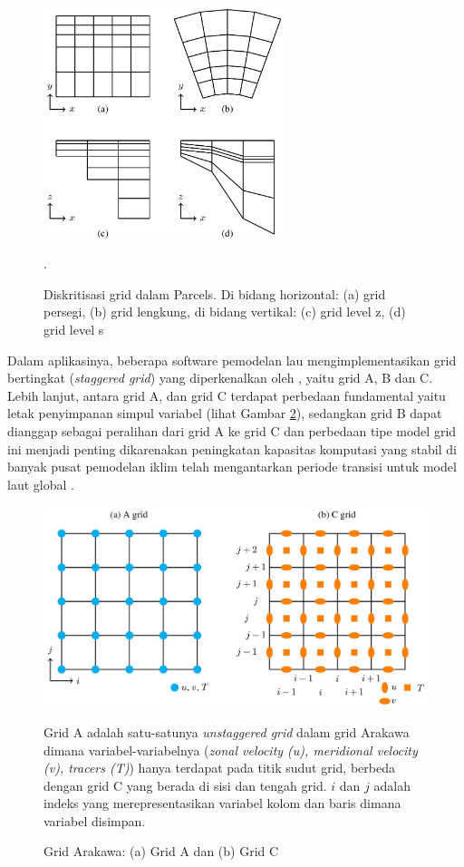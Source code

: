 \begin{spacing}{1.5}
	\begin{figure}[H]
		\centering
		\includegraphics[width=7cm]{contents/grid.jpg}
		\caption{Diskritisasi grid dalam Parcels. Di bidang horizontal: (a) grid persegi, (b) grid lengkung, di bidang vertikal: (c) grid level z, (d) grid level s \protect{}}.
		\label{fig:grid}
	\end{figure}
	
	Dalam aplikasinya, beberapa software pemodelan lau mengimplementasikan grid bertingkat (\textit{staggered grid}) yang diperkenalkan oleh , yaitu grid A, B dan C. Lebih lanjut, antara grid A, dan grid C terdapat perbedaan fundamental yaitu letak penyimpanan simpul variabel (lihat Gambar \ref{fig:arakawa}), sedangkan grid B dapat dianggap sebagai peralihan dari grid A ke grid C dan perbedaan tipe model grid ini menjadi penting dikarenakan peningkatan kapasitas komputasi yang stabil di banyak pusat pemodelan iklim telah mengantarkan periode transisi untuk model laut global  . 
	
	\begin{figure}[H]
		\centering
		\includegraphics[width=13cm]{contents/arakawa.jpg}
		\caption{Grid Arakawa: (a) Grid A dan (b) Grid C \protect{}}
		\label{fig:arakawa}
		\medspace
		\small
		Grid A adalah satu-satunya \textit{unstaggered grid} dalam grid Arakawa dimana variabel-variabelnya (\textit{zonal velocity (u), meridional velocity (v), tracers (T)}) hanya terdapat pada titik sudut grid, berbeda dengan grid C yang berada di sisi dan tengah grid. $i$ dan $j$ adalah indeks yang merepresentasikan variabel kolom dan baris dimana variabel disimpan.
	\end{figure}

\end{spacing}
